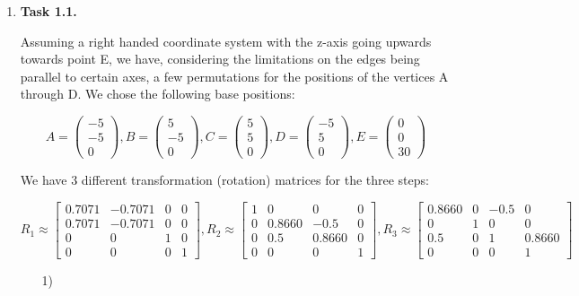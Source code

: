 \documentclass[a4paper,11pt]{article}
\author{\authorinfo}
\title{\titleinfo}
\date{\today}
\newcommand{\V}[1]{\begin{pmatrix}#1\end{pmatrix}}
\begin{document}
\maketitle
\begin {enumerate}
\item[\textbf{Task 1.1.}]

    Assuming a right handed coordinate system with the z-axis going upwards
    towards point E, we have, considering the limitations on the edges being
    parallel to certain axes, a few permutations for the positions of the
    vertices A through D. We chose the following base positions:

    $$
    A = \V{-5\\-5\\0},
    B = \V{5\\-5\\0},
    C = \V{5\\5\\0},
    D = \V{-5\\5\\0},
    E = \V{0\\0\\30}
    $$

    We have 3 different transformation (rotation) matrices for the three steps:

    $$
        R_1 \approx \begin{bmatrix}
            0.7071& -0.7071 & 0 & 0\\
            0.7071& -0.7071 & 0 & 0\\
            0 & 0 & 1 & 0\\
            0 & 0 & 0 & 1
        \end{bmatrix},
        R_2 \approx \begin{bmatrix}
            1 & 0 & 0 & 0 \\
            0 & 0.8660 & -0.5 & 0 \\
            0 & 0.5 & 0.8660 & 0 \\
            0 & 0 & 0 & 1
        \end{bmatrix},
        R_3 \approx \begin{bmatrix}
            0.8660& 0 & -0.5 & 0\\
            0 & 1 & 0 & 0\\
            0.5 & 0 & 1 & 0.8660\\
            0 & 0 & 0 & 1
        \end{bmatrix}
    $$

    \begin{enumerate}
        \item[1)]


\end{enumerate}
\end{enumerate}
\end{document}
